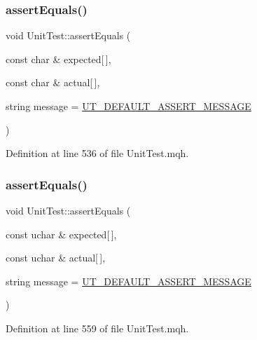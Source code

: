 \subsubsection{\texorpdfstring{assert\+Equals()}{assertEquals()}\hspace{0.1cm}{\footnotesize\ttfamily [16/28]}}
{\footnotesize\ttfamily void Unit\+Test\+::assert\+Equals (\begin{DoxyParamCaption}\item[{const char \&}]{expected\mbox{[}$\,$\mbox{]},  }\item[{const char \&}]{actual\mbox{[}$\,$\mbox{]},  }\item[{string}]{message = {\ttfamily \mbox{\hyperlink{_unit_test_8mqh_a96f5d62188d09039ebc3f443c9120e39}{U\+T\+\_\+\+D\+E\+F\+A\+U\+L\+T\+\_\+\+A\+S\+S\+E\+R\+T\+\_\+\+M\+E\+S\+S\+A\+GE}}} }\end{DoxyParamCaption})}



Definition at line 536 of file Unit\+Test.\+mqh.

\mbox{\label{class_unit_test_a170058a3d05888f547ea0912d0fe6756}} 
\subsubsection{\texorpdfstring{assert\+Equals()}{assertEquals()}\hspace{0.1cm}{\footnotesize\ttfamily [17/28]}}
{\footnotesize\ttfamily void Unit\+Test\+::assert\+Equals (\begin{DoxyParamCaption}\item[{const uchar \&}]{expected\mbox{[}$\,$\mbox{]},  }\item[{const uchar \&}]{actual\mbox{[}$\,$\mbox{]},  }\item[{string}]{message = {\ttfamily \mbox{\hyperlink{_unit_test_8mqh_a96f5d62188d09039ebc3f443c9120e39}{U\+T\+\_\+\+D\+E\+F\+A\+U\+L\+T\+\_\+\+A\+S\+S\+E\+R\+T\+\_\+\+M\+E\+S\+S\+A\+GE}}} }\end{DoxyParamCaption})}



Definition at line 559 of file Unit\+Test.\+mqh.

\mbox{\label{class_unit_test_ad7afd8e2f1a6b35eabf2671285776d7c}} 
